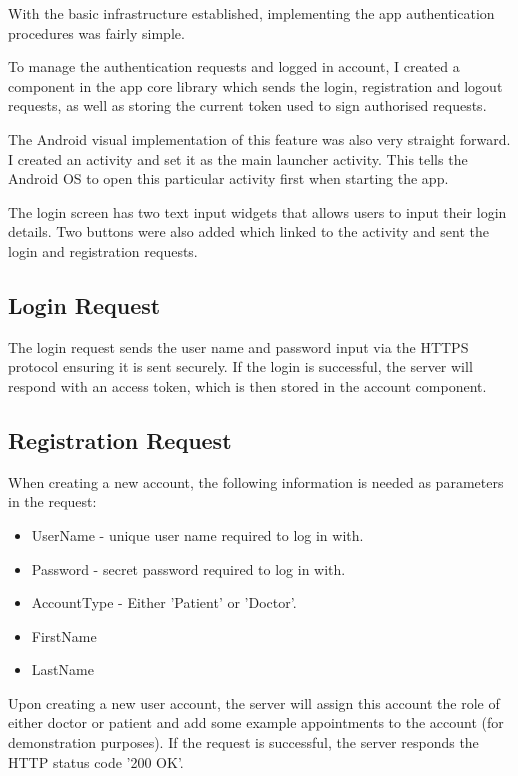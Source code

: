 With the basic infrastructure established, implementing the app authentication procedures was fairly simple.

To manage the authentication requests and logged in account, I created a component in the app core library which sends the login, registration and logout requests, as well as storing the current token used to sign authorised requests.

The Android visual implementation of this feature was also very straight forward. I created an activity and set it as the main launcher activity. This tells the Android OS to open this particular activity first when starting the app.

The login screen has two text input widgets that allows users to input their login details. Two buttons were also added which linked to the activity and sent the login and registration requests.

\subsection{Login Request}

The login request sends the user name and password input via the HTTPS protocol ensuring it is sent securely. If the login is successful, the server will respond with an access token, which is then stored in the account component.

\subsection{Registration Request}

When creating a new account, the following information is needed as parameters in the request:

\begin{itemize}
	\item UserName - unique user name required to log in with.
	\item Password - secret password required to log in with.
	\item AccountType - Either 'Patient' or 'Doctor'.
	\item FirstName
	\item LastName
\end{itemize}

Upon creating a new user account, the server will assign this account the role of either doctor or patient and add some example appointments to the account (for demonstration purposes). If the request is successful, the server responds the HTTP status code '200 OK'.

